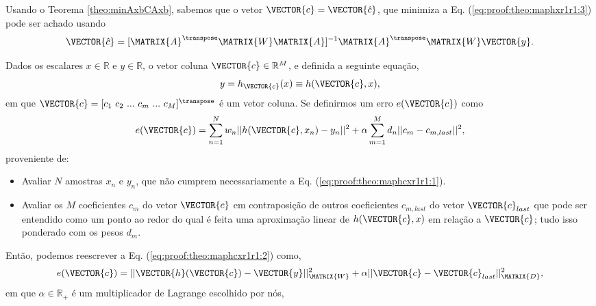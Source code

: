 \begin{myproofT}
Usando o Teorema \ref{theo:minAxbCAxb}, sabemos que o vetor $\VECTOR{c}=\VECTOR{\hat{c}}$,
que minimiza a Eq. (\ref{eq:proof:theo:maphxr1r1:3}) pode ser achado usando 
\begin{equation}\label{eq:proof:theo:maphxr1r1:5}
\VECTOR{\hat{c}}=[\MATRIX{A}^{\transpose}\MATRIX{W}\MATRIX{A}]^{-1}\MATRIX{A}^{\transpose}\MATRIX{W}\VECTOR{y}.
\end{equation}
\end{myproofT}

\begin{myproofT}\label{proof:theo:maphcxr1r1}
Dados
os escalares $x \in \mathbb{R}$ e $y \in \mathbb{R}$, o vetor coluna $\VECTOR{c} \in \mathbb{R}^M$, e 
definida a seguinte equação,
\begin{equation}\label{eq:proof:theo:maphcxr1r1:1}
y=h_{\VECTOR{c}}(x)\equiv h(\VECTOR{c},x),
\end{equation}
em que $\VECTOR{c}=[c_1~ c_2~ ...~ c_m~ ...~ c_M]^{\transpose}$ é um vetor coluna.
Se definirmos um erro $e(\VECTOR{c})$ como
\begin{equation}\label{eq:proof:theo:maphcxr1r1:2}
e(\VECTOR{c}) =  \sum_{n=1}^{N} w_n||h(\VECTOR{c},x_n)-y_n||^2 + \alpha \sum_{m=1}^{M} d_n||c_m-c_{m,last}||^2,
\end{equation}
proveniente de:
\begin{itemize}
\item Avaliar $N$ amostras $x_n$ e $y_n$, que não cumprem necessariamente a Eq. (\ref{eq:proof:theo:maphcxr1r1:1}). 
\item Avaliar os $M$ coeficientes $c_m$ do vetor $\VECTOR{c}$ 
em contraposição de outros coeficientes $c_{m,last}$ do vetor $\VECTOR{c}_{last}$
que pode ser entendido como um ponto ao redor do qual é feita uma aproximação
linear de $h(\VECTOR{c},x)$ em relação a $\VECTOR{c}$; 
tudo isso ponderado com os pesos $d_m$.
\end{itemize}
Então, podemos reescrever a Eq. (\ref{eq:proof:theo:maphcxr1r1:2}) como,
\begin{equation}\label{eq:proof:theo:maphcxr1r1:3}
e(\VECTOR{c}) =  ||\VECTOR{h}(\VECTOR{c})-\VECTOR{y}||_{\MATRIX{W}}^2 + \alpha||\VECTOR{c}-\VECTOR{c}_{last}||_{\MATRIX{D}}^2,
\end{equation}
em que $\alpha \in \mathbb{R}_+$ é um multiplicador de Lagrange escolhido por nós,

\end{myproofT}
